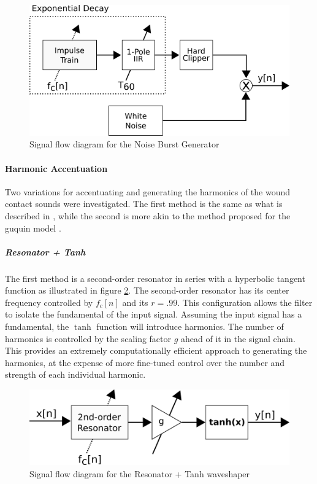 \documentclass[../main.tex]{subfiles}
\begin{document}
\begin{figure}[h]
    \centering
    \includegraphics[scale=.5]{./images/diagrams/NoiseBurstGen.png}
    \caption{Signal flow diagram for the Noise Burst Generator}
    \label{fig:NoiseBurstGen}
\end{figure}

\paragraph{Harmonic Accentuation}
Two variations for accentuating and generating the harmonics of the wound contact sounds were investigated. The first method is the same as what is described in , while the second is more akin to the method proposed for the guquin model .

\subparagraph{Resonator + Tanh}
The first method is a second-order resonator in series with a hyperbolic tangent function as illustrated in figure \ref{fig:ResoTanh}. The second-order resonator has its center frequency controlled by $f_c[n]$ and its $r = .99$. This configuration allows the filter to isolate the fundamental of the input signal. Assuming the input signal has a fundamental, the $\tanh$ function will introduce harmonics. The number of harmonics is controlled by the scaling factor $g$ ahead of it in the signal chain. This provides an extremely computationally efficient approach to generating the harmonics, at the expense of more fine-tuned control over the number and strength of each individual harmonic.

\begin{figure}[h]
    \centering
    \includegraphics[scale=.5]{./images/diagrams/ResoTanh.png}
    \caption{Signal flow diagram for the Resonator + Tanh waveshaper}
    \label{fig:ResoTanh}
\end{figure}
\end{document}

